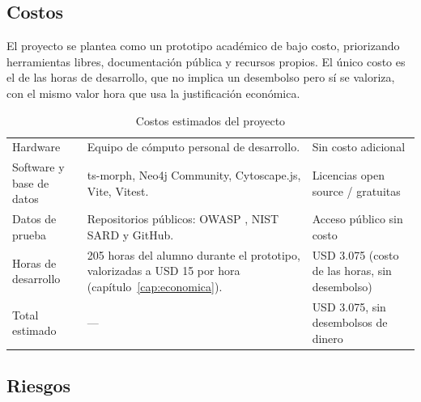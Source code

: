 \subsection{Costos}\label{sec:n2.4.3}

El proyecto se plantea como un prototipo académico de bajo costo, priorizando herramientas libres, documentación pública y recursos propios. El único costo es el de las horas de desarrollo, que no implica un desembolso pero sí se valoriza, con el mismo valor hora que usa la justificación económica.

\begin{table}[H]
    \centering
    \caption{Costos estimados del proyecto}
    \label{tab:costos}
    \small
    \begin{tabularx}{\textwidth}{l L L}
        \toprule
         &  &  \\
        \midrule
        Hardware & Equipo de cómputo personal de desarrollo. & Sin costo adicional \\
        Software y base de datos & ts-morph, Neo4j Community, Cytoscape.js, Vite, Vitest. & Licencias open source / gratuitas \\
        Datos de prueba & Repositorios públicos: OWASP \citep{owaspbenchmark}, NIST SARD \citep{nistsard} y GitHub. & Acceso público sin costo \\
        Horas de desarrollo & 205 horas del alumno durante el prototipo, valorizadas a USD 15 por hora (capítulo~\ref{cap:economica}). & USD 3.075 (costo de las horas, sin desembolso) \\
        Total estimado & — & USD 3.075, sin desembolsos de dinero \\
        \bottomrule
    \end{tabularx}
\end{table}

\subsection{Riesgos}\label{sec:n2.4.4}

